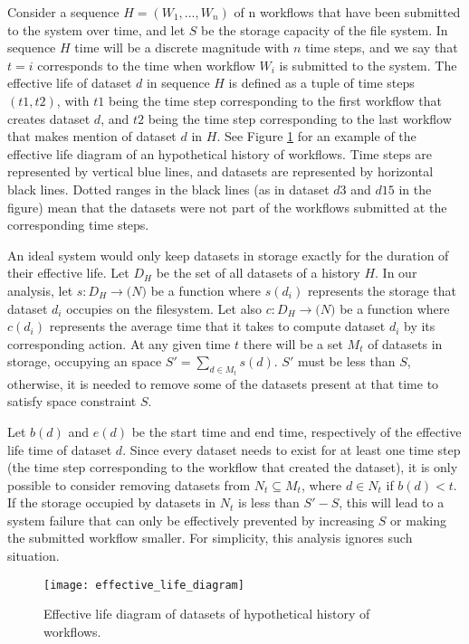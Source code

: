 Consider a sequence $H=(W_1, ..., W_n)$ of n workflows that have been submitted to the system over time, and let $S$ be the storage capacity of the file system.  In sequence $H$ time will be a discrete magnitude with $n$ time steps, and we say that $t = i$ corresponds to the time when workflow $W_i$ is submitted to the system. The effective life of dataset $d$ in sequence $H$ is defined as a tuple of time steps $(t1, t2)$, with $t1$ being the time step corresponding to the first workflow that creates dataset $d$, and  $t2$ being the time step corresponding to the last workflow that makes mention of dataset $d$ in $H$.  See Figure \ref{fig:effective_life} for an example of the effective life diagram of an hypothetical history of workflows.  Time steps are represented by vertical blue lines, and datasets are represented by horizontal black lines.  Dotted ranges in the black lines (as in dataset $d3$ and $d15$ in the figure) mean that the datasets were not part of the workflows submitted at the corresponding time steps.

An ideal system would only keep datasets in storage exactly for the duration of their effective life.  Let $D_H$ be the set of all datasets of a history $H$.  In our analysis, let $s: D_H \to \mathtt(N)$ be a function where $s(d_i)$ represents the storage that dataset $d_i$ occupies on the filesystem.  Let also $c: D_H \to \mathtt(N)$ be a function where $c(d_i)$ represents the average time that it takes to compute dataset $d_i$ by its corresponding action. At any given time $t$ there will be a set $M_t$ of datasets in storage, occupying an space $S' = \sum_{d \in M_t}{s(d)}$.  $S'$ must be less than $S$, otherwise, it is needed to remove some of the datasets present at that time to satisfy space constraint $S$.

Let $b(d)$ and $e(d)$ be the start time and end time, respectively of the effective life time of dataset $d$.  Since every dataset needs to exist for at least one time step (the time step corresponding to the workflow that created the dataset), it is only possible to consider removing datasets from $N_t \subseteq M_t$, where $d \in N_t$ if $b(d) < t$.  If the storage occupied by datasets in $N_t$ is less than $S' - S$, this will lead to a system failure that can only be effectively prevented by increasing $S$ or making the submitted workflow smaller.  For simplicity, this analysis ignores such situation.

\begin{figure}
\centering
\texttt{[image: effective\_life\_diagram]}
\caption{Effective life diagram of datasets of hypothetical history of workflows.}
\label{fig:effective_life}
\end{figure}

